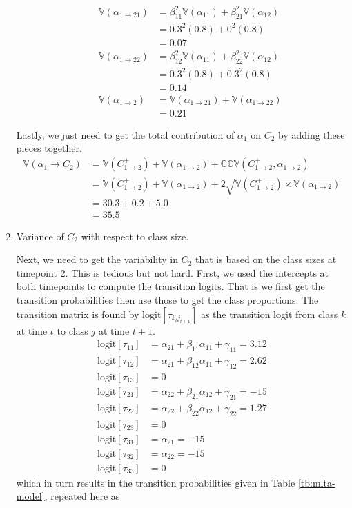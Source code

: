 \documentclass[12pt]{article}
\begin{document}
\begin{enumerate}
\begin{itemize}
\begin{align*}
\mathbb{V}(\alpha_{1 \rightarrow 21}) &= \beta_{11}^2\mathbb{V}(\alpha_{11}) + \beta_{21}^2\mathbb{V}(\alpha_{12})\\
&= 0.3^2(0.8) + 0^2(0.8)\\
&= 0.07\\
\mathbb{V}(\alpha_{1 \rightarrow 22}) &= \beta_{12}^2\mathbb{V}(\alpha_{11}) + \beta_{22}^2\mathbb{V}(\alpha_{12})\\
&= 0.3^2(0.8) + 0.3^2(0.8)\\
&= 0.14\\
\mathbb{V}(\alpha_{1\rightarrow 2})&= \mathbb{V}(\alpha_{1\rightarrow 21}) + \mathbb{V}(\alpha_{1\rightarrow 22})\\
&=  0.21
\end{align*}
\end{itemize}
Lastly, we just need to get the total contribution of $\alpha_1$ on $C_2$ by adding these pieces together.
\begin{align*}
\mathbb{V}(\alpha_1\rightarrow C_2) &= \mathbb{V}(C_{1\rightarrow 2}^{+}) + \mathbb{V}(\alpha_{1\rightarrow 2}) + \mathbb{COV}(C_{1\rightarrow 2}^{+}, \alpha_{1\rightarrow 2})\\
&=  \mathbb{V}(C_{1\rightarrow 2}^{+}) + \mathbb{V}(\alpha_{1\rightarrow 2}) + 2\sqrt{\mathbb{V}(C_{1\rightarrow 2}^{+})\times \mathbb{V}(\alpha_{1\rightarrow 2})}\\
&= 30.3 + 0.2 + 5.0\\
&= 35.5
\end{align*}

\item Variance of $C_2$ with respect to class size.

Next, we need to get the variability in $C_2$ that is based on the class sizes at timepoint 2. This is tedious but not hard.
First, we used the intercepts at both timepoints to compute the transition logits. That is we first get the transition probabilities then use those to get the class proportions.
The transition matrix is found by $\mathrm{logit}[\tau_{k_t j_{t+1}}]$ as the transition logit from class $k$ at time $t$ to class $j$ at time $t+1$.
\begin{align*}
\mathrm{logit}[\tau_{11}] &= \alpha_{21} + \beta_{11}\alpha_{11} + \gamma_{11} = 3.12\\
\mathrm{logit}[\tau_{12}] &= \alpha_{21} + \beta_{12}\alpha_{11} + \gamma_{12} = 2.62\\
\mathrm{logit}[\tau_{13}] &= 0\\
\mathrm{logit}[\tau_{21}] &= \alpha_{22} + \beta_{21}\alpha_{12} + \gamma_{21}=-15\\
\mathrm{logit}[\tau_{22}] &= \alpha_{22} + \beta_{22}\alpha_{12} + \gamma_{22}=1.27\\
\mathrm{logit}[\tau_{23}] &= 0\\
\mathrm{logit}[\tau_{31}] &= \alpha_{21}=-15\\
\mathrm{logit}[\tau_{32}] &= \alpha_{22}=-15\\
\mathrm{logit}[\tau_{33}] &= 0
\end{align*}
which in turn results in the transition probabilities given in Table \ref{tb:mlta-model}, repeated here as


\end{enumerate}
\end{document}

